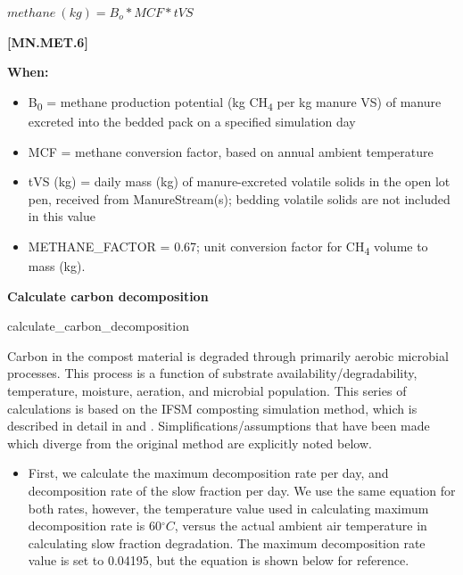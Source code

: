 \begin{refsection}
        \begin{center}
            \(methane\ (kg) = B_o * MCF * tVS\)
        \end{center}
        \vspace{0.5cm} 
    
            {\raggedleft \textbf{[MN.MET.6]}\par}
            \vspace{0.5cm}

    \textbf{When:}

    \begin{itemize}
        \item B\textsubscript{0} = methane production potential (kg CH\textsubscript{4} per kg manure VS) of manure excreted into the bedded pack on a specified simulation day
        \item MCF = methane conversion factor, based on annual ambient temperature
        \item tVS (kg) = daily mass (kg) of manure-excreted volatile solids in the open lot pen, received from ManureStream(s); bedding volatile solids are not included in this value
        \item METHANE\_FACTOR = 0.67; unit conversion factor for CH\textsubscript{4} volume to mass (kg).

    \end{itemize}
    \vspace{0.5cm}


    \textbf{Calculate carbon decomposition }
    \vspace{ 0.15cm}
    
    calculate\_carbon\_decomposition
    \vspace{0.1cm}

    Carbon in the compost material is degraded through primarily aerobic microbial processes. This process is a function of substrate availability/degradability, temperature, moisture, aeration, and microbial population. This series of calculations is based on the IFSM composting simulation method, which is described in detail in \cite{bonifacio2017a} and \cite{bonifacio2017b}. Simplifications/assumptions that have been made which diverge from the original method are explicitly noted below. 

    \begin{itemize}
        \item First, we calculate the maximum decomposition rate per day, and decomposition rate of the slow fraction per day. We use the same equation for both rates, however, the temperature value used in calculating maximum decomposition rate is 60\(^\circ C\), versus the actual ambient air temperature in calculating slow fraction degradation. The maximum decomposition rate value is set to 0.04195, but the equation is shown below for reference.
            \vspace{0.25cm}


\end{itemize}
\end{refsection}
